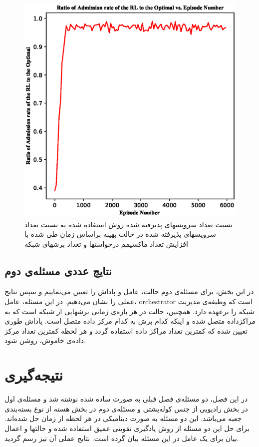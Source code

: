 \begin{figure}%
	\centering
	\includegraphics[scale = 0.6]{./fig/dynamicEpoch1_0} %
	\caption{  نسبت تعداد سرویسهای پذیرفته شده روش استفاده شده به نسبت تعداد سرویسهای پذیرفته شده در حالت بهینه براساس زمان طی شده با افزایش تعداد ماکسیمم درخواستها و تعداد برشهای شبکه}
	\label{fig:dynamicEpoch1}
\end{figure}
\subsection{نتایج عددی مسئله‌ی دوم} 
در این بخش، برای مسئله‌ی دوم حالت، عامل و پاداش را تعیین می‌نماییم و سپس نتایج عملی را نشان می‌دهیم.
در این مسئله، عامل، orchestrator است که وظیفه‌ی مدیریت شبکه را برعهده دارد.
همچنین، حالت در هر بازه‌ی زمانی برشهایی از شبکه است که به مراکزداده متصل شده و اینکه کدام برش به کدام مرکز داده متصل است.
پاداش طوری تعیین شده که کمترین تعداد مراکز داده استفاده گردد و هر لحظه کمترین تعداد مرکز داده‌ی خاموش، روشن شود.
\section{نتیجه‌گیری}
در این فصل، دو مسئله‌ی فصل قبلی به صورت ساده شده نوشته شد و مسئله‌ی اول در بخش رادیویی از جنس کوله‌پشتی و مسئله‌ی دوم در بخش هسته از نوع 
بسته‌بندی جعبه می‌باشد. این دو مسئله به صورت دینامیکی در هر لحظه از زمان حل شده‌اند. برای حل این دو مسئله از روش یادگیری تقویتی عمیق استفاده شده و حالتها و اعمال بیان برای یک عامل در این مسئله بیان گرده است.
نتایج عملی آن نیز رسم گردید.

  